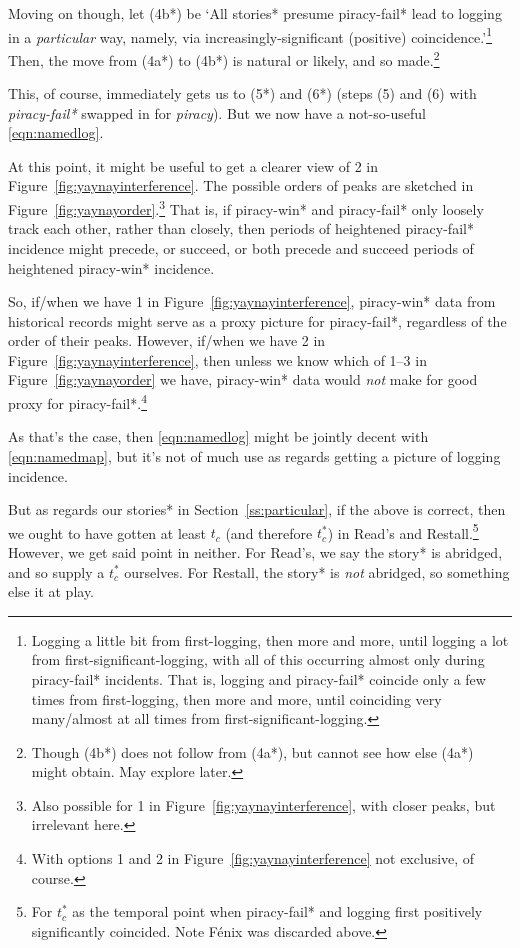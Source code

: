 \documentclass{amsart}
\newcommand{\mention}[1]{\textit{#1}} %
\theoremstyle{definition}
\theoremstyle{remark}
\begin{document}
		Moving on though, let (4b*) be `All stories* presume piracy-fail* lead to logging in a \emph{particular} way, namely, via increasingly-significant (positive) coincidence.'\footnote{Logging a little bit from first-logging, then more and more, until logging a lot from first-significant-logging, with all of this occurring almost only during piracy-fail* incidents. That is, logging and piracy-fail* coincide only a few times from first-logging, then more and more, until coinciding very many/almost at all times from first-significant-logging.} Then, the move from (4a*) to (4b*) is natural or likely, and so made.\footnote{Though (4b*) does not follow from (4a*), but cannot see how else (4a*) might obtain. May explore later.}
		
		This, of course, immediately gets us to (5*) and (6*) (steps (5) and (6) with \mention{piracy-fail*} swapped in for \mention{piracy}). But we now have a not-so-useful \ref{eqn:namedlog}.
		
		At this point, it might be useful to get a clearer view of 2 in Figure~\ref{fig:yaynayinterference}. The possible orders of peaks are sketched in Figure~\ref{fig:yaynayorder}.\footnote{Also possible for 1 in Figure~\ref{fig:yaynayinterference}, with closer peaks, but irrelevant here.} That is, if piracy-win* and piracy-fail* only loosely track each other, rather than closely, then periods of heightened piracy-fail* incidence might precede, or succeed, or both precede and succeed periods of heightened piracy-win* incidence.
		
		So, if/when we have 1 in Figure~\ref{fig:yaynayinterference}, piracy-win* data from historical records might serve as a proxy picture for piracy-fail*, regardless of the order of their peaks. However, if/when we have 2 in Figure~\ref{fig:yaynayinterference}, then unless we know which of 1--3 in Figure~\ref{fig:yaynayorder} we have, piracy-win* data would \emph{not} make for good proxy for piracy-fail*.\footnote{With options 1 and 2 in Figure~\ref{fig:yaynayinterference} not exclusive, of course.}
		
		As that's the case, then \ref{eqn:namedlog} might be jointly decent with \ref{eqn:namedmap}, but it's not of much use as regards getting a picture of logging incidence.
		
		But as regards our stories* in Section~\ref{ss:particular}, if the above is correct, then we ought to have gotten at least \(t_c\) (and therefore \(t_c^*\)) in Read's and Restall.\footnote{For \(t_c^*\) as the temporal point when piracy-fail* and logging first positively significantly coincided. Note Fénix was discarded above.} However, we get said point in neither. For Read's, we say the story* is abridged, and so supply a \(t_c^*\) ourselves. For Restall, the story* is \emph{not} abridged, so something else it at play.
		
\end{document}
